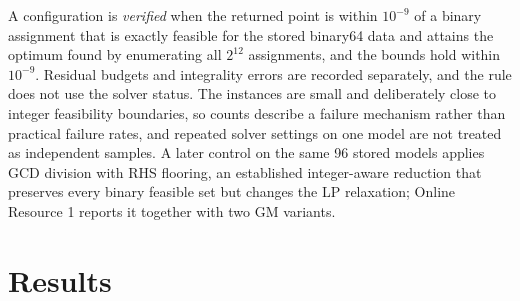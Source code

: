 \documentclass[smallextended,envcountsect,envcountsame]{svjour3}
\begin{document}
A configuration is \emph{verified} when the returned point is within $10^{-9}$ of a binary
assignment that is exactly feasible for the stored binary64 data and attains the optimum found
by enumerating all $2^{12}$ assignments, and the bounds hold within $10^{-9}$. Residual budgets
and integrality errors are recorded separately, and the rule does not use the solver status.
The instances are small and deliberately close to integer feasibility boundaries, so counts
describe a failure mechanism rather than practical failure rates, and repeated solver settings
on one model are not treated as independent samples. A later control on the same 96 stored
models applies GCD division with RHS flooring, an established integer-aware reduction that
preserves every binary feasible set but changes the LP relaxation; Online Resource 1 reports it
together with two GM variants.

\section{Results}
\label{sec:results}
\end{document}
